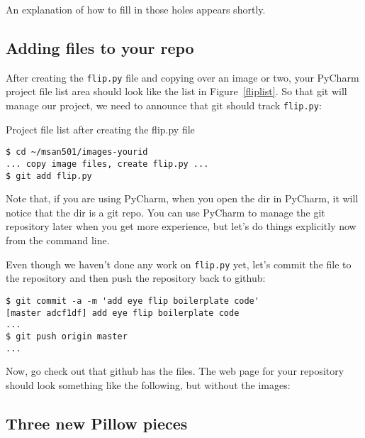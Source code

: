 \documentclass[titlepage]{tufte-book}
\newcommand{\figref}[1]{Figure~\ref{#1}}
\begin{document}
An explanation of how to fill in those holes appears shortly.

\subsection{Adding files to your repo}

After creating the {\tt flip.py} file and copying over an image or two, your PyCharm project file list area should look like the list in \figref{fliplist}.  So that git will manage our project, we need to announce that git should track {\tt flip.py}:


\begin{marginfigure}
\begin{center}
\end{center}
\caption{Project file list after creating the flip.py file}
\label{fliplist}
\end{marginfigure}

\begin{lstlisting}[style=BashInputStyle]
$ cd ~/msan501/images-yourid
... copy image files, create flip.py ...
$ git add flip.py
\end{lstlisting}

Note that, if you are using PyCharm, when you open the dir in PyCharm, it will notice that the dir is a git repo. You can use PyCharm to manage the git repository later when you get more experience, but let's do things explicitly now from the command line.

Even though we haven't done any work on {\tt flip.py} yet, let's commit the file to the repository and then push the repository back to github:

\begin{lstlisting}[style=BashInputStyle]
$ git commit -a -m 'add eye flip boilerplate code'
[master adcf1df] add eye flip boilerplate code
...
$ git push origin master
...
\end{lstlisting}

Now, go check out that github has the files. The web page for your repository should look something like the following, but without the images:


\subsection{Three new Pillow pieces}
\end{document}
